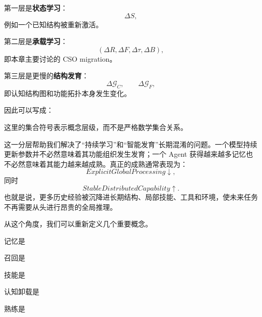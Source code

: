 第一层是\textbf{状态学习}：
\[
\Delta S,
\]
例如一个已知结构被重新激活。

第二层是\textbf{承载学习}：
\[
(\Delta R,\Delta F,\Delta\tau,\Delta B),
\]
即本章主要讨论的 CSO migration。

第三层是更慢的\textbf{结构发育}：
\[
\Delta\mathcal G_C,
\qquad
\Delta\mathcal G_F,
\]
即认知结构图和功能拓扑本身发生变化。

因此可以写成：
\begin{statementbox}
\centering
{}
\end{statementbox}
这里的集合符号表示概念层级，而不是严格数学集合关系。

这一分层帮助我们解决了“持续学习”和“智能发育”长期混淆的问题。一个模型持续更新参数并不必然意味着其功能组织发生发育；一个 Agent 获得越来越多记忆也不必然意味着其能力越来越成熟。真正的成熟通常表现为：
\[
ExplicitGlobalProcessing
\downarrow,
\]
同时
\[
StableDistributedCapability
\uparrow.
\]
也就是说，更多历史经验被沉降进长期结构、局部技能、工具和环境，使未来任务不再需要从头进行昂贵的全局推理。

从这个角度，我们可以重新定义几个重要概念。

记忆是
\begin{statementbox}
\centering
{}
\end{statementbox}

召回是
\begin{statementbox}
\centering
{}
\end{statementbox}

技能是
\begin{statementbox}
\centering
{}
\end{statementbox}

认知卸载是
\begin{statementbox}
\centering
{}
\end{statementbox}

熟练是
\begin{statementbox}
\centering
{}
\end{statementbox}

